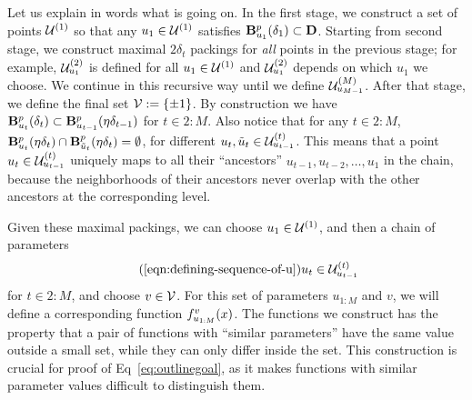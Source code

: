 Let us explain in words what is going on. In the first stage, we construct a set of points $\Uone$ so that any $u_1 \in \Uone$ satisfies $\ballp{u_1}{\delta_1} \subset \domain$.
Starting from second stage, we construct maximal $2\delta_t$ packings for \emph{all} points in the previous stage;
for example, $\Utemp{1}{2}$ is defined for all $u_1 \in \Uone$ and $\Utemp{1}{2}$ depends on which $u_1$ we choose.
We continue in this recursive way until we define $\Utemp{M-1}{M}$. After that stage, we define the final set $\V \defeq \{ \pm 1\}$.
By construction we have $\ballp{u_t}{\delta_t} \subset \ballp{u_{t-1}}{\eta \delta_{t-1}}$ for $t \in 2:M$.
Also notice that for any $t \in 2:M$, $\ballp{u_{t}}{\eta \delta_{t}} \cap \ballp{\tilde u_{t}}{\eta \delta_{t}} = \emptyset$,
for different $u_t, \tilde u_t \in \Utemp{t-1}{t}$.
This means that a point $u_t \in \Utemp{t-1}{t}$ uniquely maps to all their ``ancestors'' $u_{t-1}, u_{t-2}, \dots, u_1$ in the chain,
because the neighborhoods of their ancestors never overlap with the other ancestors at the corresponding level.

Given these maximal packings, we can choose $u_1 \in \Uone$,
and then a chain of parameters
\begin{equation}
\tag{\ref{eqn:defining-sequence-of-u}}
u_t \in \mc{U}^{(t)}_{u_{t-1}}
\end{equation}
for $t \in 2:M$, and choose $v \in \V$.
For this set of parameters $u_{1:M}$ and $v$, we will define a corresponding function $\ftnuv(x)$. The functions we construct has the property that a pair of functions with ``similar parameters'' have the same value outside a small set, while they can only differ inside the set. This construction is crucial for proof of Eq~\eqref{eq:outlinegoal}, as it makes functions with similar parameter values difficult to distinguish them.

